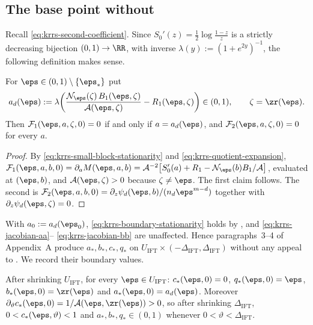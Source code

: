 \subsection{The base point without \texorpdfstring{\cite{kenyon2014entropy}}{KRR-S}}
\label{kb:sec:base}

Recall \eqref{eq:krrs-second-coefficient}.  Since
$S_0'(z)=\tfrac12\log\frac{1-z}{z}$ is a strictly decreasing bijection
$(0,1)\to\RR$, with inverse $\lambda(y):=(1+e^{2y})^{-1}$, the following
definition makes sense.

\begin{lemma}\label{kb:lem:base-point}
For $\eps\in(0,1)\setminus\{\eps_*\}$ put
\[
  a_d(\eps)
  :=\lambda\!\left(
      \frac{\mathcal N_\eps(\zeta)\,B_1(\eps,\zeta)}{\mathcal A(\eps,\zeta)}
      -R_1(\eps,\zeta)\right)\in(0,1),
  \qquad \zeta=\zr(\eps).
\]
Then $\mathcal F_1(\eps,a,\zeta,0)=0$ if and only if $a=a_d(\eps)$, and
$\mathcal F_2(\eps,a,\zeta,0)=0$ for every $a$.
\end{lemma}

\begin{proof}
By \eqref{eq:krrs-small-block-stationarity} and
\eqref{eq:krrs-quotient-expansion},
$\mathcal F_1(\eps,a,b,0)=\partial_aM(\eps,a,b)
 =\mathcal A^{-2}\bigl[S_0'(a)+R_1-\mathcal N_\eps(b)B_1/\mathcal A\bigr]$,
evaluated at $(\eps,b)$, and $\mathcal A(\eps,\zeta)>0$ because
$\zeta\ne\eps$.  The first claim follows.  The second is
$\mathcal F_2(\eps,a,b,0)=\partial_z\psi_d(\eps,b)/(n_d\eps^{m-d})$ together
with $\partial_z\psi_d(\eps,\zeta)=0$.
\end{proof}

With $a_0:=a_d(\eps_0)$, \eqref{eq:krrs-boundary-stationarity} holds by
, and \eqref{eq:krrs-jacobian-aa}--%
\eqref{eq:krrs-jacobian-bb} are unaffected.  Hence paragraphs~3--4 of
Appendix~A produce $a_*,b_*,c_*,q_*$ on
$U_{\mathrm{IFT}}\times(-\Delta_{\mathrm{IFT}},\Delta_{\mathrm{IFT}})$
without any appeal to \cite{kenyon2014entropy}.  We record their boundary
values.

\begin{lemma}\label{kb:lem:boundary}
After shrinking $U_{\mathrm{IFT}}$, for every $\eps\in U_{\mathrm{IFT}}$:
$c_*(\eps,0)=0$, $q_*(\eps,0)=\eps$, $b_*(\eps,0)=\zr(\eps)$ and
$a_*(\eps,0)=a_d(\eps)$.  Moreover $\partial_\vartheta c_*(\eps,0)
=1/\mathcal A(\eps,\zr(\eps))>0$, so after shrinking $\Delta_{\mathrm{IFT}}$,
$0<c_*(\eps,\vartheta)<1$ and $a_*,b_*,q_*\in(0,1)$ whenever
$0<\vartheta<\Delta_{\mathrm{IFT}}$.
\end{lemma}

